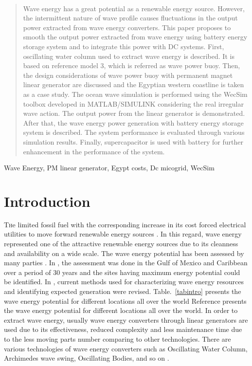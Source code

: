 \documentclass[conference]{IEEEtran}
\begin{document}
\maketitle
\
\begin{abstract}
Wave energy has a great potential as a renewable energy source. However, the intermittent nature of wave profile causes fluctuations in the output power extracted from wave energy converters. This paper proposes to smooth the output power extracted from wave energy using battery energy storage system and to integrate this power with DC systems. First, oscillating water column used to extract wave energy is described. It is based on reference model 3, which is referred as wave power buoy. Then, the design considerations of wave power buoy with permanent magnet linear generator are discussed and the Egyptian western coastline is taken as a case study. The ocean wave simulation is performed using the WecSim toolbox developed in MATLAB/SIMULINK considering the real irregular wave action. The output power from the linear generator is demonstrated. After that, the wave energy power generation with battery energy storage system is described. The system performance is evaluated through various simulation results. Finally, supercapacitor is used with battery for further enhancement in the performance of the system.
\end{abstract}

\begin{IEEEkeywords}
Wave Energy, PM linear generator, Egypt costs, Dc micogrid, WecSim
\end{IEEEkeywords}

\section{Introduction}
\lettrine{T}he limited fossil fuel with the corresponding increase in its cost forced electrical utilities to move forward renewable energy sources \cite{elkholy2020general,elkholy2018advanced}. In this regard, wave energy represented one of the attractive renewable energy sources due to its cleanness and availability on a wide scale. The wave energy potential has been assessed by many parties \cite{1,2,eslkoly2017islanding}. In \cite{1}, the assessment was done in the Gulf of Mexico and Caribbean over a period of 30 years and the sites having maximum energy potential could be identified. In \cite{2}, current methods used for characterizing wave energy resources and identifying expected generation were revised. Table.~\ref{tabintro} presents the wave energy potential for different locations all over the world \cite{3} Reference \cite{3}  presents the wave energy potential for different locations all over the world. In order to extract wave energy, usually wave energy converters through linear generators are used due to its effectiveness, reduced complexity and  less maintenance time due to the less moving parts number comparing to other technologies. There are various technologies of wave energy converters such as Oscillating Water Column, Archimedes wave swing, Oscillating Bodies, and so on \cite{3}.
\end{document}
